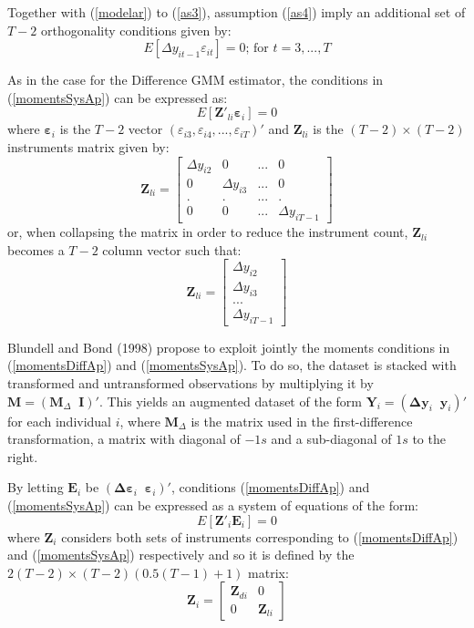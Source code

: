 Together with (\ref{modelar}) to (\ref{as3}), assumption (\ref{as4}) imply an additional set of $T-2$ orthogonality conditions given by:
\begin{equation}
\label{momentsSysAp}
\tag{7'}
E\left[\Delta y_{it-1} \varepsilon_{it}\right]=0 \text{; for $t=3,...,T$}
\end{equation}

As in the case for the Difference GMM estimator, the conditions in (\ref{momentsSysAp}) can be expressed as:
\begin{equation*}
E\left[ \mathbf{Z}'_{li}\mathbf{ \varepsilon}_{i}\right]=0
\end{equation*}
where $\mathbf{\varepsilon}_{i}$ is the $T-2$ vector $( \varepsilon_{i3}, \varepsilon_{i4},..., \varepsilon_{iT})'$ and $\mathbf{Z}_{li}$ is the $(T-2)\times (T-2)$ instruments matrix given by:
\[
\mathbf{Z}_{li} = 
\left[ {\begin{array}{*{20}{c}}
{\Delta {y_{i2}}}&0&{...}&0\\
0&{\Delta {y_{i3}}}&{...}&0\\
.&.&{...}&.\\
0&0&{...}&{\Delta {y_{iT - 1}}}
\end{array}} \right]
\]
or, when collapsing the matrix in order to reduce the instrument count, $\mathbf{Z}_{li}$ becomes a $T-2$ column vector such that:
\[
\mathbf{Z}_{li} = 
\left[ {\begin{array}{*{20}{c}}
{\Delta {y_{i2}}}\\
{\Delta {y_{i3}}}\\
{...}\\
{\Delta {y_{iT - 1}}}
\end{array}} \right]
\]

Blundell and Bond (1998) propose to exploit jointly the moments conditions in (\ref{momentsDiffAp}) and (\ref{momentsSysAp}). To do so, the dataset is stacked with transformed and untransformed observations by multiplying it by $\mathbf{M}=\left(\mathbf{M}_{\Delta}\;\;\mathbf{I}\right)'$. This yields an augmented dataset of the form $ \mathbf{Y}_{i}=\left(\mathbf{\Delta} \mathbf{y}_{i}\;\;\mathbf{y}_i\right)'$ for each individual $i$, where $\mathbf{M}_{\Delta}$ is the matrix used in the first-difference transformation, a matrix with diagonal of $-1s$ and a sub-diagonal of $1s$ to the right. 

By letting $\mathbf{E}_i$ be $\left(\mathbf{\Delta} \mathbf{\varepsilon}_{i}\;\;\mathbf{\varepsilon}_i\right)'$, conditions (\ref{momentsDiffAp}) and (\ref{momentsSysAp}) can be expressed as a system of equations of the form:
\begin{equation*}
E\left[ \mathbf{Z}'_{i}\mathbf{E}_{i}\right]=0
\end{equation*}
where $\mathbf{Z}_{i}$ considers both sets of instruments corresponding to (\ref{momentsDiffAp}) and (\ref{momentsSysAp}) respectively and so it is defined by the $2(T-2)\times (T-2)(0.5(T-1)+1)$ matrix:
\[{\mathbf{Z}_i} = \left[ {\begin{array}{*{20}{c}}
{{\mathbf{Z}_{di}}}&0\\
0&{{\mathbf{Z}_{li}}}
\end{array}} \right]\]

